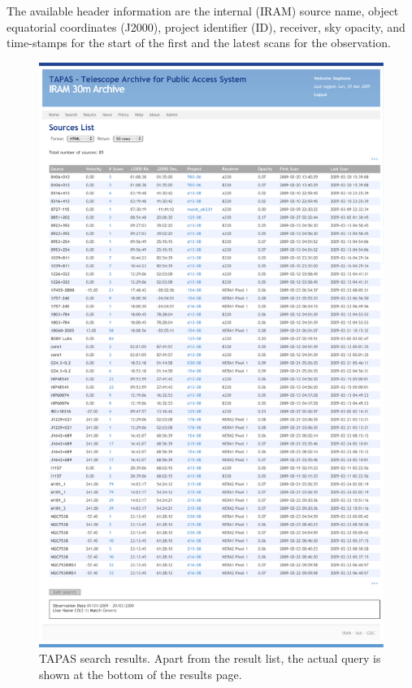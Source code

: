 			The available header information are the internal
			(IRAM) source name, object equatorial coordinates
			(J2000), project identifier (ID), receiver, sky
			opacity, and time-stamps for the start of the first
			and the latest scans for the observation.
			
			\begin{figure}[tbp]
				\centering
					\includegraphics[totalheight=\textheight]
					{fig/TAPAS_searchResults.pdf}
				\caption[TAPAS search results]
				{TAPAS search results. Apart from the result list,
				the actual query is shown at the bottom of the
				results page.}
				\label{fig:fig_TAPAS_searchResults}
			\end{figure}
			

